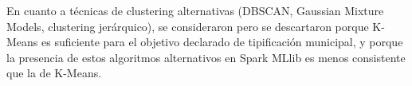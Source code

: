 En cuanto a técnicas de clustering alternativas (DBSCAN, Gaussian Mixture Models, clustering jerárquico), se consideraron pero se descartaron porque K-Means es suficiente para el objetivo declarado de tipificación municipal, y porque la presencia de estos algoritmos alternativos en Spark MLlib es menos consistente que la de K-Means.
